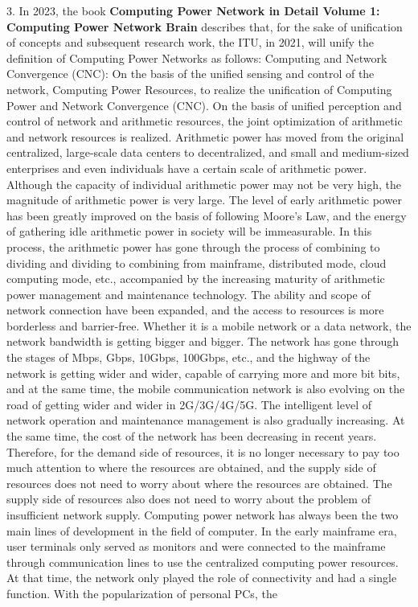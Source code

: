 \documentclass[a4paper,twoside]{scrbook}
\begin{document}
\begin{CJK}{UTF8}{gbsn}
3. In 2023, the book \textbf{Computing Power Network in Detail Volume 1: Computing Power Network Brain} describes that, for the sake of unification of concepts and subsequent research work, the ITU, in 2021, will unify the definition of Computing Power Networks as follows: Computing and Network Convergence (CNC): On the basis of the unified sensing and control of the network, Computing Power Resources, to realize the unification of Computing Power and Network Convergence (CNC). On the basis of unified perception and control of network and arithmetic resources, the joint optimization of arithmetic and network resources is realized. Arithmetic power has moved from the original centralized, large-scale data centers to decentralized, and small and medium-sized enterprises and even individuals have a certain scale of arithmetic power. Although the capacity of individual arithmetic power may not be very high, the magnitude of arithmetic power is very large. The level of early arithmetic power has been greatly improved on the basis of following Moore's Law, and the energy of gathering idle arithmetic power in society will be immeasurable. In this process, the arithmetic power has gone through the process of combining to dividing and dividing to combining from mainframe, distributed mode, cloud computing mode, etc., accompanied by the increasing maturity of arithmetic power management and maintenance technology.
The ability and scope of network connection have been expanded, and the access to resources is more borderless and barrier-free. Whether it is a mobile network or a data network, the network bandwidth is getting bigger and bigger. The network has gone through the stages of Mbps, Gbps, 10Gbps, 100Gbps, etc., and the highway of the network is getting wider and wider, capable of carrying more and more bit bits, and at the same time, the mobile communication network is also evolving on the road of getting wider and wider in 2G/3G/4G/5G. The intelligent level of network operation and maintenance management is also gradually increasing. At the same time, the cost of the network has been decreasing in recent years. Therefore, for the demand side of resources, it is no longer necessary to pay too much attention to where the resources are obtained, and the supply side of resources does not need to worry about where the resources are obtained.
The supply side of resources also does not need to worry about the problem of insufficient network supply.
Computing power network has always been the two main lines of development in the field of computer. In the early mainframe era, user terminals only served as monitors and were connected to the mainframe through communication lines to use the centralized computing power resources. At that time, the network only played the role of connectivity and had a single function. With the popularization of personal PCs, the

\end{CJK}
\end{document}
